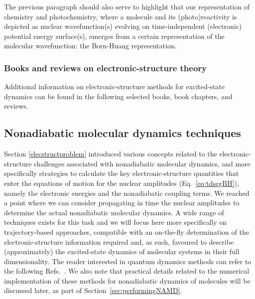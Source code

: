 \documentclass[9pt,bestpractices]{livecoms}
\begin{document}
The previous paragraph should also serve to highlight that our representation of chemistry and photochemistry, where a molecule and its (photo)reactivity is depicted as nuclear wavefunction(s) evolving on time-independent (electronic) potential energy surface(s), emerges from a certain representation of the molecular wavefunction: the Born-Huang representation.

\subsubsection{Books and reviews on electronic-structure theory}
Additional information on electronic-structure methods for excited-state dynamics can be found in the following selected books\cite{gonzalez_quantum_2021,tddftcarsten,GONZALEZ20241,conicalintersection2004}, book chapters,\cite{barbatti2014surface} and reviews.\cite{park2020multireference,lischka2018multireference,dreuw2015algebraic,crespo2018recent,curchod2013local,matsika_electronic_2021}

\subsection{Nonadiabatic molecular dynamics techniques}
\label{nonadiabaticdynproblem}

Section \ref{elecstructproblem} introduced various concepts related to the electronic-structure challenges associated with nonadiabatic molecular dynamics, and more specifically strategies to calculate the key electronic-structure quantities that enter the equations of motion for the nuclear amplitudes (Eq.~\eqref{eq:tdsegBH}), namely the electronic energies and the nonadiabatic coupling terms. We reached a point where we can consider propagating in time the nuclear amplitudes to determine the actual nonadiabatic molecular dynamics. A wide range of techniques exists for this task and we will focus here more specifically on trajectory-based approaches, compatible with an on-the-fly determination of the electronic-structure information required and, as such, favoured to describe (approximately) the excited-state dynamics of molecular systems in their full dimensionality. The reader interested in quantum dynamics methods can refer to the following Refs.~. We also note that practical details related to the numerical implementation of these methods for nonadiabatic dynamics of molecules will be discussed later, as part of Section~\ref{sec:performingNAMD}.
\end{document}
